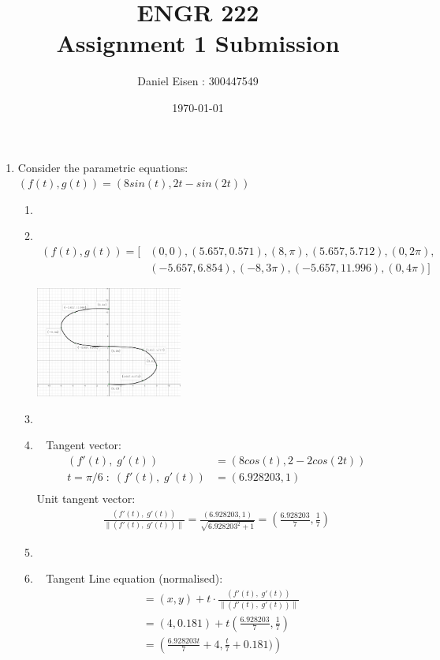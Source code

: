 \documentclass[11pt]{article}
\title{ENGR 222 \\ Assignment 1 Submission}
\author{Daniel Eisen : 300447549}
\date{\today}
\newcommand\Item[1][]{%
  \ifx\relax#1\relax  \item \else \item[#1] \fi
  \abovedisplayskip=0pt\abovedisplayshortskip=0pt~\vspace*{-\baselineskip}}
\begin{document}
\maketitle
\begin{enumerate}
    \item Consider the parametric equations:
          $(f(t),g(t)) = (8sin(t),2t-sin(2t))$
          \begin{enumerate}
              \Item %
              \begin{align*}
                  (f(t),g(t)) = [ & (0,0),(5.657,0.571),(8,\pi),(5.657,5.712),(0,2\pi), \\
                                  & (-5.657,6.854),(-8,3\pi),(-5.657,11.996),(0,4\pi)]
              \end{align*}

              \begin{center}
                  \includegraphics[width=0.4\textwidth]{inc/1a.png}
              \end{center}

              \Item %
              Tangent vector:\\
              \begin{align*}
                  (f'(t),\; g'(t))               & = (8cos(t), 2 - 2cos(2t)) \\
                  t=\pi/6 \;:\; (f'(t),\; g'(t)) & = (6.928203,1)            \\
              \end{align*}
              Unit tangent vector:\\
              \begin{align*}
                  \frac{(f'(t),\; g'(t))}{\| (f'(t),\; g'(t)) \|} = \frac{(6.928203,1)}{\sqrt{6.928203^2+1}} = \left(\frac{6.928203}{7},\frac{1}{7}\right)
              \end{align*}

              \Item %
              Tangent Line equation (normalised):\\
              \begin{align*}
                   & = (x,y) + t{\cdot} \frac{(f'(t),\; g'(t))}{\| (f'(t),\; g'(t)) \|} \\
                   & = (4,0.181) + t\left(\frac{6.928203}{7},\frac{1}{7}\right)         \\
                   & = \left(\frac{6.928203t}{7}+4,\frac{t}{7}+0.181)\right)
              \end{align*}


\end{enumerate}
\end{enumerate}
\end{document}
